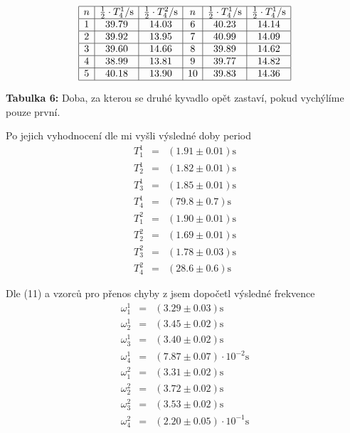 \documentclass[a4paper,12pt]{article}
\begin{document}
$$
\begin{array}{|c|c|c|c|c|c|}
\hline
	n&	{1 \over2}\cdot T_4^1/\mbox{s}&	{1 \over 2}\cdot T_4^2/\mbox{s}&	n&	{1\over2}\cdot T_4^1/\mbox{s}&	{1\over2}\cdot T_4^1/\mbox{s} \\ \hline	
	1&	39.79&	14.03&	6&	40.23&	14.14 \\ \hline
	2&	39.92&	13.95&	7&	40.99&	14.09 \\ \hline
	3&	39.60&	14.66&	8&	39.89&	14.62 \\ \hline
	4&	38.99&	13.81&	9&	39.77&	14.82 \\ \hline
	5&	40.18&	13.90&	10&	39.83&	14.36 \\ \hline
\end{array}
$$
\begin{center}
	\textbf{Tabulka 6:} Doba, za kterou se druhé kyvadlo opět zastaví, pokud vychýlíme pouze první.
\end{center}

Po jejich vyhodnocení dle \cite{4} mi vyšli výsledné doby period
\begin{eqnarray}
	T_1^1&=&(1.91 \pm 0.01) \mbox{s} \\
	T_2^1&=&(1.82 \pm 0.01) \mbox{s} \\
	T_3^1&=&(1.85 \pm 0.01) \mbox{s} \\
	T_4^1&=&(79.8 \pm 0.7) \mbox{s} \\
	T_1^2&=&(1.90 \pm 0.01) \mbox{s} \\
	T_2^2&=&(1.69 \pm 0.01) \mbox{s} \\
	T_3^2&=&(1.78 \pm 0.03) \mbox{s} \\
	T_4^2&=&(28.6 \pm 0.6) \mbox{s}
\end{eqnarray}

Dle (11) a vzorců pro přenos chyby z \cite{4} jsem dopočetl výsledné frekvence
\begin{eqnarray}
	\omega_1^1&=&(3.29 \pm 0.03) \mbox{s} \\
	\omega_2^1&=&(3.45 \pm 0.02) \mbox{s} \\
	\omega_3^1&=&(3.40 \pm 0.02) \mbox{s} \\
	\omega_4^1&=&(7.87 \pm 0.07)\cdot 10^{-2} \mbox{s} \\
	\omega_1^2&=&(3.31 \pm 0.02) \mbox{s} \\
	\omega_2^2&=&(3.72 \pm 0.02) \mbox{s} \\
	\omega_3^2&=&(3.53 \pm 0.02) \mbox{s} \\
	\omega_4^2&=&(2.20 \pm 0.05)\cdot 10^{-1} \mbox{s}
\end{eqnarray}
\end{document}
